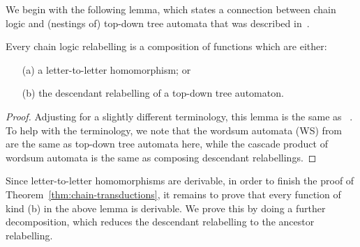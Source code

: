 We begin with the following lemma, which states a connection between chain logic and (nestings of) top-down tree automata that was described in~\cite{bojanczykDecidablePropertiesTree2004}.
\begin{lemma}\label{lem:chain-phd}
    Every chain logic relabelling is a composition of functions which are either:
    \begin{itemize}
        \item[(a)] a letter-to-letter homomorphism; or 
        \item[(b)] the descendant relabelling of  a  top-down tree automaton.
    \end{itemize}
\end{lemma}
\begin{proof}
    Adjusting for a slightly different terminology, this lemma is the same as ~\cite[Theorem 2.5.9]{bojanczykDecidablePropertiesTree2004}. To help with the terminology, we note that the wordsum automata (WS) from~\cite{bojanczykDecidablePropertiesTree2004}  are the same as top-down tree automata here, while the cascade product of wordsum automata  is the same as composing descendant relabellings.
\end{proof}
Since letter-to-letter homomorphisms are derivable, in order to finish the proof of Theorem~\ref{thm:chain-transductions}, it  remains to prove that every function of kind (b) in the above lemma is  derivable. We prove this by doing a further decomposition, which reduces  the descendant relabelling  to the ancestor relabelling.


